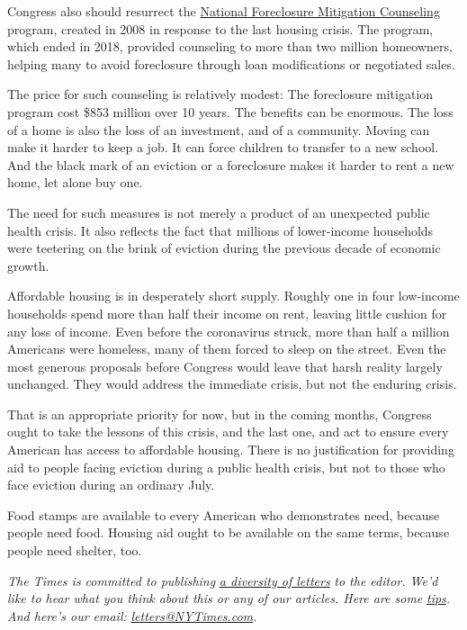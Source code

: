 Congress also should resurrect the
\href{https://neighborworks.org/NFMCCapstoneReport}{National Foreclosure
Mitigation Counseling} program, created in 2008 in response to the last
housing crisis. The program, which ended in 2018, provided counseling to
more than two million homeowners, helping many to avoid foreclosure
through loan modifications or negotiated sales.

The price for such counseling is relatively modest: The foreclosure
mitigation program cost \$853 million over 10 years. The benefits can be
enormous. The loss of a home is also the loss of an investment, and of a
community. Moving can make it harder to keep a job. It can force
children to transfer to a new school. And the black mark of an eviction
or a foreclosure makes it harder to rent a new home, let alone buy one.

The need for such measures is not merely a product of an unexpected
public health crisis. It also reflects the fact that millions of
lower-income households were teetering on the brink of eviction during
the previous decade of economic growth.

Affordable housing is in desperately short supply. Roughly one in four
low-income households spend more than half their income on rent, leaving
little cushion for any loss of income. Even before the coronavirus
struck, more than half a million Americans were homeless, many of them
forced to sleep on the street. Even the most generous proposals before
Congress would leave that harsh reality largely unchanged. They would
address the immediate crisis, but not the enduring crisis.

That is an appropriate priority for now, but in the coming months,
Congress ought to take the lessons of this crisis, and the last one, and
act to ensure every American has access to affordable housing. There is
no justification for providing aid to people facing eviction during a
public health crisis, but not to those who face eviction during an
ordinary July.

Food stamps are available to every American who demonstrates need,
because people need food. Housing aid ought to be available on the same
terms, because people need shelter, too.

\emph{The Times is committed to publishing}
\href{https://www.nytimes3xbfgragh.onion/2019/01/31/opinion/letters/letters-to-editor-new-york-times-women.html}{\emph{a
diversity of letters}} \emph{to the editor. We'd like to hear what you
think about this or any of our articles. Here are some}
\href{https://help.nytimes3xbfgragh.onion/hc/en-us/articles/115014925288-How-to-submit-a-letter-to-the-editor}{\emph{tips}}\emph{.
And here's our email:}
\href{mailto:letters@NYTimes.com}{\emph{letters@NYTimes.com}}\emph{.}


